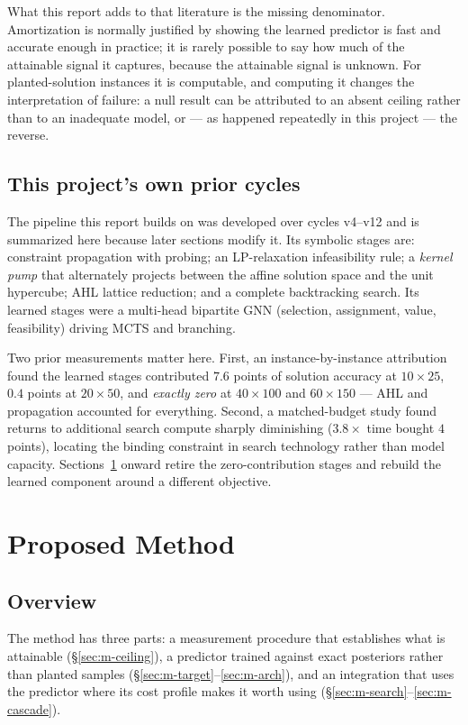 \documentclass[12pt]{article}
\begin{document}
What this report adds to that literature is the missing denominator. Amortization is normally justified by showing the learned predictor is fast and accurate enough in practice; it is rarely possible to say how much of the attainable signal it captures, because the attainable signal is unknown. For planted-solution instances it is computable, and computing it changes the interpretation of failure: a null result can be attributed to an absent ceiling rather than to an inadequate model, or --- as happened repeatedly in this project --- the reverse.

\subsection{This project's own prior cycles}
\label{sec:priorcycles}

The pipeline this report builds on was developed over cycles v4--v12 and is summarized here because later sections modify it. Its symbolic stages are: constraint propagation with probing; an LP-relaxation infeasibility rule; a \emph{kernel pump} that alternately projects between the affine solution space and the unit hypercube; AHL lattice reduction; and a complete backtracking search. Its learned stages were a multi-head bipartite GNN (selection, assignment, value, feasibility) driving MCTS and branching.

Two prior measurements matter here. First, an instance-by-instance attribution found the learned stages contributed $7.6$ points of solution accuracy at $10\times25$, $0.4$ points at $20\times50$, and \emph{exactly zero} at $40\times100$ and $60\times150$ --- AHL and propagation accounted for everything. Second, a matched-budget study found returns to additional search compute sharply diminishing ($3.8\times$ time bought $4$ points), locating the binding constraint in search technology rather than model capacity. Sections~\ref{sec:method} onward retire the zero-contribution stages and rebuild the learned component around a different objective.

\section{Proposed Method}
\label{sec:method}

\subsection{Overview}

The method has three parts: a measurement procedure that establishes what is attainable (\S\ref{sec:m-ceiling}), a predictor trained against exact posteriors rather than planted samples (\S\ref{sec:m-target}--\ref{sec:m-arch}), and an integration that uses the predictor where its cost profile makes it worth using (\S\ref{sec:m-search}--\ref{sec:m-cascade}).
\end{document}
